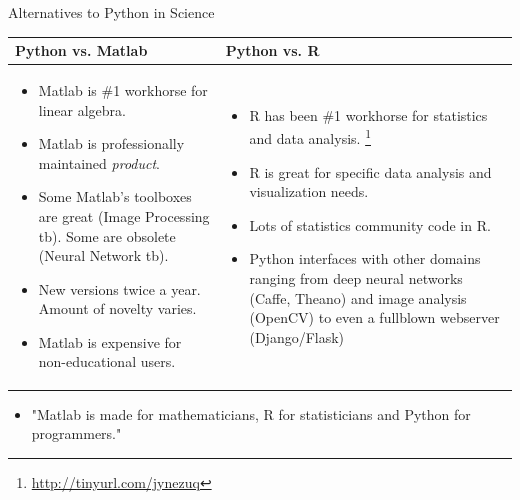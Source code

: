 \documentclass[10pt, aspectratio=169]{beamer} %
\begin{document}
\begin{frame}{Alternatives to Python in Science}
\begin{tabularx}{1.1\textwidth}{ l || l }

\textbf{Python vs. Matlab} & \textbf{Python vs. R} \\
\hline\hline
\begin{minipage}{0.48\textwidth}
{\small
\begin{itemize}
\item Matlab is \#1 workhorse for linear algebra.
\item Matlab is professionally maintained \emph{product}.
\item Some Matlab's toolboxes are great (Image Processing tb). 
Some are obsolete (Neural Network tb).
\item New versions twice a year. Amount of novelty varies.
\item Matlab is expensive for non-educational users.
\end{itemize}
}
\end{minipage}
&
\begin{minipage}{0.5\textwidth}
{\small
\begin{itemize}
\item R has been \#1 workhorse for statistics and data analysis. \footnote{\url{http://tinyurl.com/jynezuq}}
\item R is great for specific data analysis and visualization needs.
\item Lots of statistics community code in R.
\item Python interfaces with other domains ranging from deep neural networks (Caffe, Theano)
and image analysis (OpenCV) to even a fullblown webserver (Django/Flask)
\end{itemize}
}
\end{minipage}\\

\hline\hline
\end{tabularx}

\begin{itemize}
\item "Matlab is made for mathematicians, R for statisticians and Python for programmers."
\end{itemize}

\end{frame}
\end{document}
